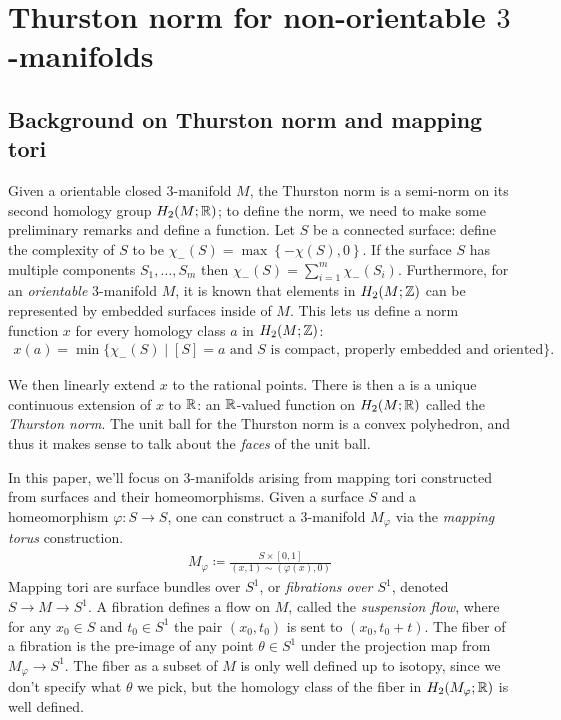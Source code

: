 \section{Thurston norm for non-orientable $3$-manifolds}
\label{sec:thur-norm-non-orientable}

\subsection{Background on Thurston norm and mapping tori}
\label{sec:backgr-thurst-norm}

Given a orientable closed $3$-manifold $M$, the Thurston norm is a semi-norm on its second homology group $H_2(M; \mathbb{R})$; to define the norm, we need to make some preliminary remarks and define a function.
Let $S$ be a connected surface: define the complexity of $S$ to be $\chi_-(S) = \max\left\{-\chi(S),0\right\}$.
If the surface $S$ has multiple components $S_1, \ldots, S_m$ then $\chi_-(S) = \displaystyle\sum_{i=1}^m\chi_-(S_i)$.
Furthermore, for an \emph{orientable} 3-manifold $M$, it is known that elements in $H_2(M ; \mathbb{Z})$ can be represented by embedded surfaces inside of $M$.
This lets us define a norm function $x$ for every homology class $a$ in $H_2(M; \mathbb{Z})$:
\begin{align*}
  x(a) = \min\{\chi_-(S) \mid [S] = a \text{ and $S$ is compact, properly embedded and oriented}\}.
\end{align*}

We then linearly extend $x$ to the rational points.
There is then a is a unique continuous extension of $x$ to $\mathbb{R}$: an $\mathbb{R}$-valued function on $H_2(M; \mathbb{R})$ called the \emph{Thurston norm}.
The unit ball for the Thurston norm is a convex polyhedron, and thus it makes
sense to talk about the \emph{faces} of the unit ball.

In this paper, we'll focus on $3$-manifolds arising from mapping tori constructed from surfaces and their homeomorphisms.
Given a surface $S$ and a homeomorphism $\varphi: S \to S$, one can construct a $3$-manifold $M_\varphi$ via the \emph{mapping torus} construction.
\begin{align*}
  M_\varphi \coloneqq \frac{S \times [0,1]}{(x,1) \sim (\varphi(x), 0)}
\end{align*}
Mapping tori are surface bundles over $S^1$, or \emph{fibrations over $S^1$}, denoted $S\rightarrow M\rightarrow S^1$.
A fibration defines a flow on $M$, called the \emph{suspension flow}, where for any $x_0\in S$ and $t_0\in S^1$ the pair $(x_0,t_0)$ is sent to $(x_0,t_0+t)$.
The fiber of a fibration is the pre-image of any point $\theta \in S^1$ under the projection map from $M_{\varphi} \to S^1$.
The fiber as a subset of $M$ is only well defined up to isotopy, since we don't specify what $\theta$ we pick, but the homology class of the fiber in $H_2(M_{\varphi}; \mathbb{R})$ is well defined.

